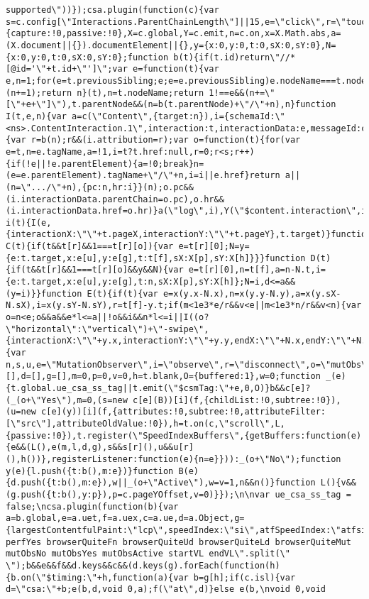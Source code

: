 \documentclass[
]{article}
\begin{document}
\begin{verbatim}
supported\"))});csa.plugin(function(c){var s=c.config[\"Interactions.ParentChainLength\"]||15,e=\"click\",r=\"touches\",f=\"timeStamp\",o=\"length\",u=\"pageX\",g=\"pageY\",p=\"pageXOffset\",h=\"pageYOffset\",m=250,v=5,d=200,l=.5,t={capture:!0,passive:!0},X=c.global,Y=c.emit,n=c.on,x=X.Math.abs,a=(X.document||{}).documentElement||{},y={x:0,y:0,t:0,sX:0,sY:0},N={x:0,y:0,t:0,sX:0,sY:0};function b(t){if(t.id)return\"//*[@id='\"+t.id+\"']\";var e=function(t){var e,n=1;for(e=t.previousSibling;e;e=e.previousSibling)e.nodeName===t.nodeName&&(n+=1);return n}(t),n=t.nodeName;return 1!==e&&(n+=\"[\"+e+\"]\"),t.parentNode&&(n=b(t.parentNode)+\"/\"+n),n}function I(t,e,n){var a=c(\"Content\",{target:n}),i={schemaId:\"<ns>.ContentInteraction.1\",interaction:t,interactionData:e,messageId:c.UUID()};if(n){var r=b(n);r&&(i.attribution=r);var o=function(t){for(var e=t,n=e.tagName,a=!1,i=t?t.href:null,r=0;r<s;r++){if(!e||!e.parentElement){a=!0;break}n=(e=e.parentElement).tagName+\"/\"+n,i=i||e.href}return a||(n=\".../\"+n),{pc:n,hr:i}}(n);o.pc&&(i.interactionData.parentChain=o.pc),o.hr&&(i.interactionData.href=o.hr)}a(\"log\",i),Y(\"$content.interaction\",i)}function i(t){I(e,{interactionX:\"\"+t.pageX,interactionY:\"\"+t.pageY},t.target)}function C(t){if(t&&t[r]&&1===t[r][o]){var e=t[r][0];N=y={e:t.target,x:e[u],y:e[g],t:t[f],sX:X[p],sY:X[h]}}}function D(t){if(t&&t[r]&&1===t[r][o]&&y&&N){var e=t[r][0],n=t[f],a=n-N.t,i={e:t.target,x:e[u],y:e[g],t:n,sX:X[p],sY:X[h]};N=i,d<=a&&(y=i)}}function E(t){if(t){var e=x(y.x-N.x),n=x(y.y-N.y),a=x(y.sX-N.sX),i=x(y.sY-N.sY),r=t[f]-y.t;if(m<1e3*e/r&&v<e||m<1e3*n/r&&v<n){var o=n<e;o&&a&&e*l<=a||!o&&i&&n*l<=i||I((o?\"horizontal\":\"vertical\")+\"-swipe\",{interactionX:\"\"+y.x,interactionY:\"\"+y.y,endX:\"\"+N.x,endY:\"\"+N.y},y.e)}}}n(a,e,i,t),n(a,\"touchstart\",C,t),n(a,\"touchmove\",D,t),n(a,\"touchend\",E,t)});csa.plugin(function(t){var n,s,u,e=\"MutationObserver\",i=\"observe\",r=\"disconnect\",o=\"mutObs\",c=t.global,a=c.document,f=a.body||a.documentElement,b=Date.now,l=[],d=[],g=[],m=0,p=0,v=0,h=t.blank,O={buffered:1},w=0;function _(e){t.global.ue_csa_ss_tag||t.emit(\"$csmTag:\"+e,0,O)}b&&c[e]?(_(o+\"Yes\"),m=0,(s=new c[e](B))[i](f,{childList:!0,subtree:!0}),(u=new c[e](y))[i](f,{attributes:!0,subtree:!0,attributeFilter:[\"src\"],attributeOldValue:!0}),h=t.on(c,\"scroll\",L,{passive:!0}),t.register(\"SpeedIndexBuffers\",{getBuffers:function(e){e&&(L(),e(m,l,d,g),s&&s[r](),u&&u[r](),h())},registerListener:function(e){n=e}})):_(o+\"No\");function y(e){l.push({t:b(),m:e})}function B(e){d.push({t:b(),m:e}),w||_(o+\"Active\"),w=v=1,n&&n()}function L(){v&&(g.push({t:b(),y:p}),p=c.pageYOffset,v=0)}});\n\nvar ue_csa_ss_tag = false;\ncsa.plugin(function(b){var a=b.global,e=a.uet,f=a.uex,c=a.ue,d=a.Object,g={largestContentfulPaint:\"lcp\",speedIndex:\"si\",atfSpeedIndex:\"atfsi\",visuallyLoaded50:\"vl50\",visuallyLoaded90:\"vl90\",visuallyLoaded100:\"vl100\"},k=\"perfNo perfYes browserQuiteFn browserQuiteUd browserQuiteLd browserQuiteMut mutObsNo mutObsYes mutObsActive startVL endVL\".split(\" \");b&&e&&f&&d.keys&&c&&(d.keys(g).forEach(function(h){b.on(\"$timing:\"+h,function(a){var b=g[h];if(c.isl){var d=\"csa:\"+b;e(b,d,void 0,a);f(\"at\",d)}else e(b,\nvoid 0,void 
\end{verbatim}
\end{document}
